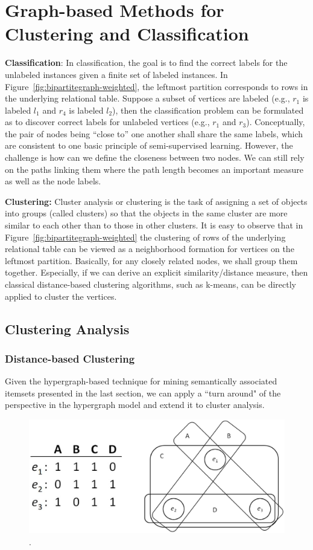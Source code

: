 \section{Graph-based Methods for Clustering and Classification}

\textbf{Classification}:
\label{sec:classification}
In classification, the goal is to find the correct labels for the unlabeled instances given a finite set of labeled instances. In Figure~\ref{fig:bipartitegraph-weighted}, the leftmost partition corresponds to rows in the underlying relational table. Suppose a subset of vertices are labeled (e.g., $r_1$ is labeled $l_1$ and $r_4$ is labeled $l_2$), then the classification problem can be formulated as to discover correct labels for unlabeled vertices (e.g., $r_1$ and $r_3$). Conceptually, the pair of nodes being ``close to'' one another shall share the same labels, which are consistent to one basic principle of  semi-supervised learning. However, the challenge is how can we define the closeness between two nodes. We can still rely on the paths linking them where the path length becomes an important measure as well as the node labels.

\textbf{Clustering:}
Cluster analysis or clustering is the task of assigning a set of objects into groups (called clusters) so that the objects in the same cluster are more similar to each other than to those in other clusters. It is easy to observe that in Figure~\ref{fig:bipartitegraph-weighted}  the clustering of rows of the underlying relational table can be viewed as a neighborhood formation for vertices on the leftmost partition. Basically, for any closely related nodes, we shall group them together. Especially, if we can derive an explicit  similarity/distance measure, then classical distance-based clustering algorithms, such as k-means, can be directly applied to cluster the vertices.

\subsection{Clustering Analysis}
\subsubsection{Distance-based Clustering}

Given the hypergraph-based technique for mining semantically associated itemsets presented in the last section, we can apply a ``turn around" of the perspective in the hypergraph model and extend it to cluster analysis.
\begin{figure}[tbh]
\centering
\includegraphics[width=.6\textwidth]{fig/hypergraph-column-wise.eps}
\caption{\label{fig:hypergraph-column-wise} .}
\end{figure}

